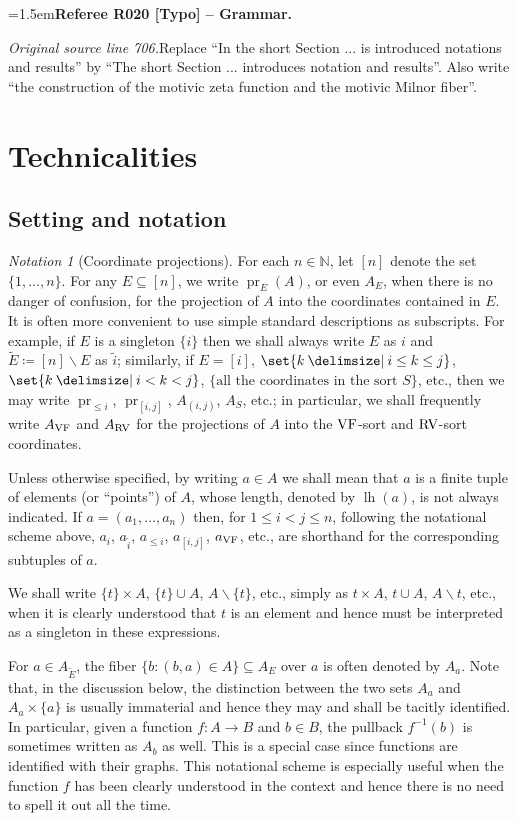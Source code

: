 \documentclass[12pt]{amsart}
\newcommand{\RefereeRemark}[4]{%
  \par\medskip\begingroup\normalfont\small\color{RefereePurple}%
  \emergencystretch=1.5em\noindent\textbf{Referee R#1 [#2] -- #3.}\par\nobreak\noindent #4\par
  \endgroup\medskip
}
\theoremstyle{plain}
\theoremstyle{definition}
\theoremstyle{remark}
\newtheorem{nota}[thm]{Notation}
\numberwithin{equation}{section}
\theoremstyle{plain}
\newcommand{\VF}{\textup{VF}}
\newcommand{\RV}{\textup{RV}}
\DeclareMathOperator{\lh}{lh}
\DeclareMathOperator{\pr}{pr}
\newcommand{\N}{\mathds{N}}
\newcommand{\0}{\emptyset}
\newcommand{\fun}{\longrightarrow}
\newcommand{\sub}{\subseteq}
\newcommand{\mi}{\smallsetminus}
\providecommand\given{}
\newcommand\SetSymbol[1][]{%
\nonscript \: #1 \vert
\allowbreak
\nonscript\:
\mathopen{}}
\renewcommand\given{\SetSymbol[\delimsize]}
\begin{document}
\RefereeRemark{020}{Typo}{Grammar}{%
\textit{Original source line 706.}\quad Replace ``In the short Section ... is introduced notations and results'' by ``The short Section ... introduces notation and results''. Also write ``the construction of the motivic zeta function and the motivic Milnor fiber''. 
}



\section{Technicalities}
\label{sec-tech}

\subsection{Setting and notation}\label{sec:notation}

\begin{nota}[Coordinate projections]\label{indexing}
For each $n \in \N$, let $[n]$ denote the set $\{1, \ldots, n\}$. For any $E \sub [n]$, we write $\pr_E(A)$, or even $A_E$, when there is no danger of confusion, for the projection of $A$ into the coordinates contained in $E$. It is often more convenient to use simple standard descriptions as subscripts. For example, if $E$ is a singleton $\{i\}$ then we shall always write $E$ as $i$ and $\tilde E \coloneqq [n] \mi E$ as $\tilde i$; similarly, if $E = [i]$, $\set{k \given  i \leq k \leq j}$, $\set{k \given  i < k < j}$, $\{\text{all the coordinates in the sort $S$}\}$, etc., then we may write $\pr_{\leq i}$, $\pr_{[i, j]}$, $A_{(i, j)}$, $A_{S}$, etc.; in particular, we shall frequently write $A_{\VF}$ and $A_{\RV}$ for the projections of $A$ into the $\VF$-sort and $\RV$-sort coordinates.


Unless otherwise specified, by writing $a \in A$ we shall mean that $a$ is a finite tuple of elements (or ``points'') of $A$, whose length, denoted by $\lh(a)$, is not always indicated. If $a = (a_1, \ldots, a_n)$ then, for $1 \leq i < j \leq n$, following the notational scheme above, $a_i$, $a_{\tilde i}$, $a_{\leq i}$, $a_{[i, j]}$, $a_{\VF}$, etc., are shorthand for the corresponding subtuples of $a$.

We shall write $\{t\} \times A$, $\{t\} \cup A$, $A \mi \{t\}$, etc., simply as $t \times A$, $t \cup A$, $A \mi t$, etc., when it is clearly understood that $t$ is an element and hence must be interpreted as a singleton in these expressions.

For $a \in A_{\tilde E}$, the fiber $\{b : ( b, a) \in A \} \sub A_E$ over $a$ is often denoted by $A_a$. Note that, in the discussion below, the distinction between the two sets $A_a$ and $A_a \times \{a\}$ is usually immaterial and hence they may and  shall be tacitly identified. In particular, given a function $f : A \fun B$ and $b \in B$, the pullback $f^{-1}(b)$ is sometimes written as $A_b$ as well. This is a special case since functions are identified with their graphs. This notational scheme is especially useful when the function $f$ has been clearly understood in the context and hence there is no need to spell it out all the time.
\end{nota}
\end{document}

